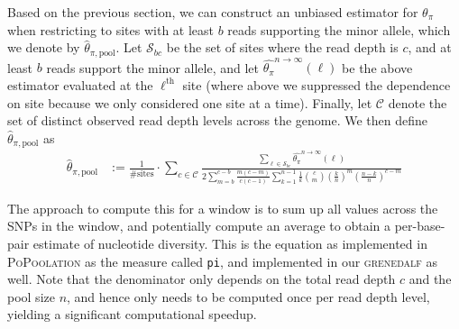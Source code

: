 \documentclass[letterpaper,fontsize=9pt,DIV=12]{scrartcl}
\newcounter{todo}
\newcommand\todo[1]{}
\newcommand\toolname{\textsc}
\newcommand{\samplesize}{n}
\newcommand{\readdepth}{c}
\newcommand{\thetapi}{\widehat{\theta_\pi}}
\begin{document}
Based on the previous section, we can construct an unbiased estimator for $\theta_\pi$ when restricting to sites with at least $b$ reads supporting the minor allele, which we denote by $\widehat{\theta}_{\pi,\text{pool}}$.  Let $\mathcal{S}_{bc}$ be the set of sites where the read depth is $c$, and at least $b$ reads support the minor allele, and let $\thetapi^{\samplesize\to\infty}(\ell)$ be the above estimator evaluated at the $\ell^\text{th}$ site (where above we suppressed the dependence on site because we only considered one site at a time).  Finally, let $\mathcal{C}$ denote the set of distinct observed read depth levels across the genome.  We then define  $\widehat{\theta}_{\pi,\text{pool}}$ as
%
\begin{align}
    \label{eq:ThetaPiPoolEstimate}
     \widehat{\theta}_{\pi,\text{pool}} &:= \frac{1}{\# \text{sites}} \cdot \sum_{c\in \mathcal{C}}
    \frac{
       \sum_{\ell \in \mathcal{S}_{bc}} \thetapi^{\samplesize\to\infty}(\ell)
    }{
        2\sum_{m=b}^{\readdepth-b} \frac{m(\readdepth-m)}{\readdepth(\readdepth-1)} \sum_{k=1}^{n-1} \frac{1}{k} \binom{\readdepth}{m} \left(\frac{k}{\samplesize}\right)^m \left(\frac{\samplesize-k}{\samplesize}\right)^{\readdepth-m}
    }
\end{align}
%

The approach to compute this for a window is to sum up all values across the SNPs in the window, and potentially compute an average to obtain a per-base-pair estimate of nucleotide diversity.
This is the equation as implemented in \toolname{PoPoolation} as the measure called \texttt{pi},
and implemented in our \toolname{grenedalf} as well. Note that the denominator only depends on the total read depth $\readdepth$ and the pool size $\samplesize$, and hence only needs to be computed once per read depth level, yielding a significant computational speedup.


\end{document}
